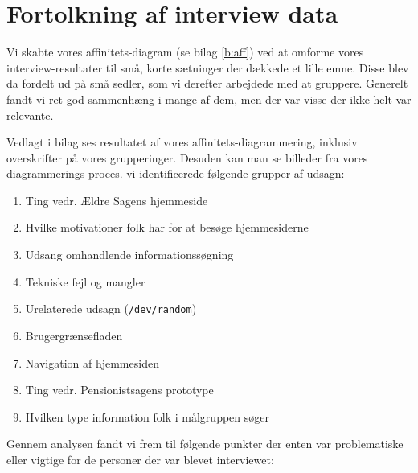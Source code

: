 \section{Fortolkning af interview data}

Vi skabte vores affinitets-diagram (se bilag \ref{b:aff}) ved at omforme vores
interview-resultater til små, korte sætninger der dækkede et lille emne.
Disse blev da fordelt ud på små sedler, som vi derefter arbejdede med at
gruppere. Generelt fandt vi ret god sammenhæng i mange af dem, men der var
visse der ikke helt var relevante.

Vedlagt i bilag ses resultatet af vores affinitets-diagrammering, inklusiv
overskrifter på vores grupperinger. Desuden kan man se billeder fra vores
diagrammerings-proces. vi identificerede følgende grupper af udsagn:

\begin{enumerate}
    \item Ting vedr. Ældre Sagens hjemmeside
    \item Hvilke motivationer folk har for at besøge hjemmesiderne
    \item Udsang omhandlende informationssøgning
    \item Tekniske fejl og mangler
    \item Urelaterede udsagn (\texttt{/dev/random})
    \item Brugergrænsefladen
    \item Navigation af hjemmesiden
    \item Ting vedr. Pensionistsagens prototype
    \item Hvilken type information folk i målgruppen søger
\end{enumerate}

Gennem analysen fandt vi frem til følgende punkter der enten var
problematiske eller vigtige for de personer der var blevet interviewet:


